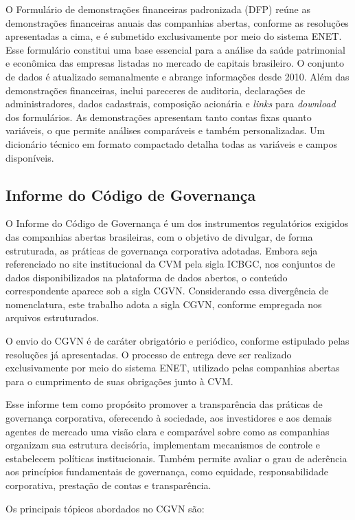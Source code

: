 O Formulário de demonstrações financeiras padronizada (DFP) reúne as demonstrações financeiras anuais das companhias abertas, conforme as resoluções apresentadas a cima, e é submetido exclusivamente por meio do sistema ENET. Esse formulário constitui uma base essencial para a análise da saúde patrimonial e econômica das empresas listadas no mercado de capitais brasileiro. O conjunto de dados é atualizado semanalmente e abrange informações desde 2010. Além das demonstrações financeiras, inclui pareceres de auditoria, declarações de administradores, dados cadastrais, composição acionária e \textit{links} para \textit{download} dos formulários. As demonstrações apresentam tanto contas fixas quanto variáveis, o que permite análises comparáveis e também personalizadas. Um dicionário técnico em formato compactado detalha todas as variáveis e campos disponíveis.

\subsection{Informe do Código de Governança}

O Informe do Código de Governança é um dos instrumentos regulatórios exigidos das companhias abertas brasileiras, com o objetivo de divulgar, de forma estruturada, as práticas de governança corporativa adotadas. Embora seja referenciado no site institucional da CVM pela sigla ICBGC, nos conjuntos de dados disponibilizados na plataforma de dados abertos, o conteúdo correspondente aparece sob a sigla CGVN. Considerando essa divergência de nomenclatura, este trabalho adota a sigla CGVN, conforme empregada nos arquivos estruturados.

O envio do CGVN é de caráter obrigatório e periódico, conforme estipulado pelas resoluções já apresentadas. O processo de entrega deve ser realizado exclusivamente por meio do sistema ENET, utilizado pelas companhias abertas para o cumprimento de suas obrigações junto à CVM.

Esse informe tem como propósito promover a transparência das práticas de governança corporativa, oferecendo à sociedade, aos investidores e aos demais agentes de mercado uma visão clara e comparável sobre como as companhias organizam sua estrutura decisória, implementam mecanismos de controle e estabelecem políticas institucionais. Também permite avaliar o grau de aderência aos princípios fundamentais de governança, como equidade, responsabilidade corporativa, prestação de contas e transparência.

Os principais tópicos abordados no CGVN são:


